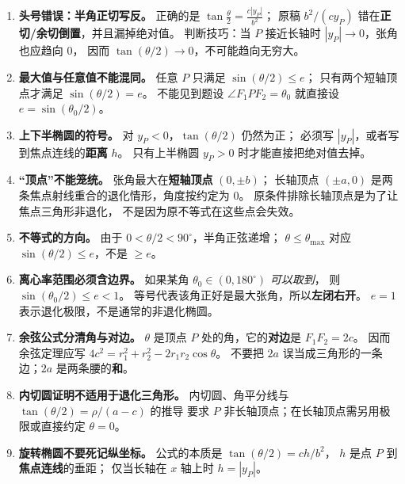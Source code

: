 \begin{trapbox}
\begin{enumerate}
  \item \textbf{头号错误：半角正切写反。}
  正确的是
  $\displaystyle\boxed{\tan\frac\theta2=\frac{c|y_P|}{b^2}}$；
  原稿 $b^2/(cy_P)$ 错在\textbf{正切/余切倒置}，并且漏掉绝对值。
  判断技巧：当 $P$ 接近长轴时 $|y_P|\to0$，张角也应趋向 $0$，
  因而 $\tan(\theta/2)\to0$，不可能趋向无穷大。

  \item \textbf{最大值与任意值不能混同。}
  任意 $P$ 只满足 $\sin(\theta/2)\le e$；
  只有两个短轴顶点才满足 $\sin(\theta/2)=e$。
  不能见到题设 $\angle F_1PF_2=\theta_0$ 就直接设
  $e=\sin(\theta_0/2)$。

  \item \textbf{上下半椭圆的符号。}
  对 $y_P<0$，$\tan(\theta/2)$ 仍然为正；
  必须写 $|y_P|$，或者写到焦点连线的\textbf{距离} $h$。
  只有上半椭圆 $y_P>0$ 时才能直接把绝对值去掉。

  \item \textbf{“顶点”不能笼统。}
  张角最大在\textbf{短轴顶点} $(0,\pm b)$；
  长轴顶点 $(\pm a,0)$ 是两条焦点射线重合的退化情形，角度按约定为 $0$。
  原条件排除长轴顶点是为了让焦点三角形非退化，
  不是因为原不等式在这些点会失效。

  \item \textbf{不等式的方向。}
  由于 $0<\theta/2<90^\circ$，半角正弦递增；
  $\theta\le\theta_{\max}$ 对应
  $\sin(\theta/2)\le e$，不是 $\ge e$。

  \item \textbf{离心率范围必须含边界。}
  如果某角 $\theta_0\in(0,180^\circ)$ \emph{可以取到}，
  则 $\boxed{\sin(\theta_0/2)\le e<1}$。
  等号代表该角正好是最大张角，所以\textbf{左闭右开}。
  $e=1$ 表示退化极限，不是通常的非退化椭圆。

  \item \textbf{余弦公式分清角与对边。}
  $\theta$ 是顶点 $P$ 处的角，它的\textbf{对边}是 $F_1F_2=2c$。
  因而余弦定理应写
  $4c^2=r_1^2+r_2^2-2r_1r_2\cos\theta$。
  不要把 $2a$ 误当成三角形的一条边；$2a$ 是两条腰的\textbf{和}。

  \item \textbf{内切圆证明不适用于退化三角形。}
  内切圆、角平分线与 $\tan(\theta/2)=\rho/(a-c)$ 的推导
  要求 $P$ 非长轴顶点；在长轴顶点需另用极限或直接约定 $\theta=0$。

  \item \textbf{旋转椭圆不要死记纵坐标。}
  公式的本质是 $\tan(\theta/2)=ch/b^2$，
  $h$ 是点 $P$ 到\textbf{焦点连线}的垂距；
  仅当长轴在 $x$ 轴上时 $h=|y_P|$。
\end{enumerate}
\end{trapbox}

